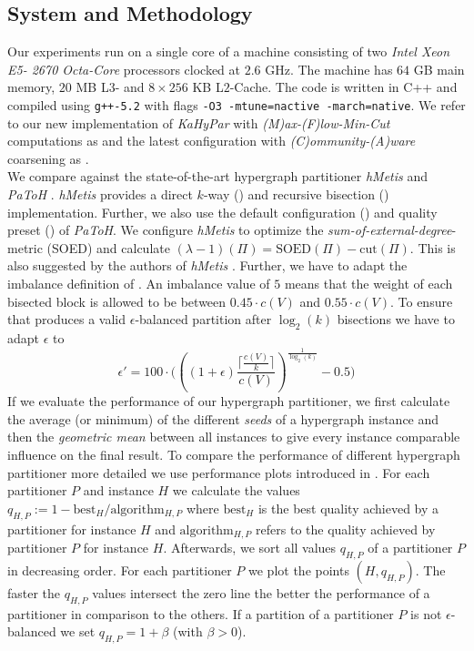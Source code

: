 \subsection{System and Methodology}
\label{sec:methodology}

Our experiments run on a single core of a machine consisting of two \emph{Intel Xeon E5-
2670 Octa-Core} processors clocked at $2.6$ GHz. The machine has $64$ GB main memory,
$20$ MB L$3$- and $8\times256$ KB L$2$-Cache. The code is written in C++ and compiled using
\lstinline{g++-5.2} with flags \lstinline{-O3 -mtune=nactive -march=native}. We refer to
our new implementation of \emph{KaHyPar} with \emph{(M)ax-(F)low-Min-Cut} computations 
as  and the latest configuration with \emph{(C)ommunity-(A)ware} coarsening as
. \\
We compare  against the state-of-the-art hypergraph partitioner \emph{hMetis} 
\cite{karypis1999multilevel,karypis2000multilevel} and \emph{PaToH} \cite{catalyurek1999hypergraph}.
\emph{hMetis} provides a direct $k$-way () and recursive bisection () implementation.
Further, we also use the default configuration () and quality preset () of
\emph{PaToH}. We configure \emph{hMetis} to optimize the \emph{sum-of-external-degree}-metric
(SOED) and calculate $(\lambda-1)(\Pi) = \text{SOED}(\Pi) - \text{cut}(\Pi)$. This is also
suggested by the authors of \emph{hMetis} \cite{karypis2000multilevel}. Further, we have
to adapt the imbalance definition of . An imbalance value of $5$ means that the weight
of each bisected block is allowed to be between $0.45 \cdot c(V)$ and $0.55 \cdot c(V)$.
To ensure that  produces a valid $\epsilon$-balanced partition after $\log_2(k)$
bisections we have to adapt $\epsilon$ to
\[\epsilon' = 100 \cdot \Bigg( \left( (1 + \epsilon) \frac{\lceil \frac{c(V)}{k} \rceil}{c(V)} \right)^{\frac{1}{\log_2(k)}} - 0.5 \Bigg)\]
If we evaluate the performance of our hypergraph partitioner,
we first calculate the average (or minimum) of the different \emph{seeds} of a hypergraph
instance and then the \emph{geometric mean} between all instances to give every instance
comparable influence on the final result. To compare the performance of different 
hypergraph partitioner more detailed we use performance plots introduced in \cite{schlag2016k}.
For each partitioner $P$ and instance $H$ we calculate the values $q_{H,P} := 1 - \text{best$_H$}/\text{algorithm$_{H,P}$}$ 
where $\text{best$_{H}$}$ is the best quality achieved by a partitioner for instance $H$ and
$\text{algorithm$_{H,P}$}$ refers to the quality achieved by partitioner $P$ for instance
$H$. Afterwards, we sort all values $q_{H,P}$ of a partitioner $P$ in decreasing order. For each
partitioner $P$ we plot the points $(H,q_{H,P})$. The faster the $q_{H,P}$ values intersect
the zero line the better the performance of a partitioner in comparison to the others. If a partition
of a partitioner $P$ is not $\epsilon$-balanced we set $q_{H,P} = 1 + \beta$ (with $\beta > 0$).

